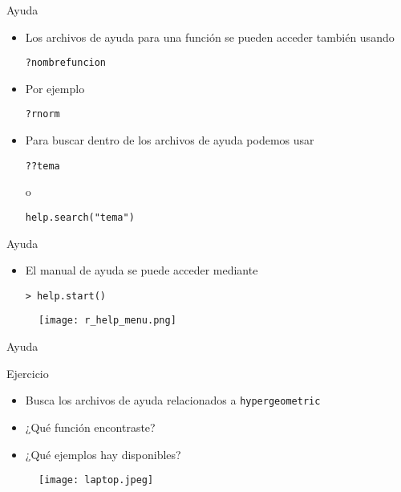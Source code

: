 \documentclass{beamer}
\begin{document}
\begin{frame}[fragile]{Ayuda}
\begin{itemize}
\item Los archivos de ayuda para una función se pueden acceder también usando
\begin{verbatim}
?nombrefuncion
\end{verbatim}
\item Por ejemplo
\begin{verbatim}
?rnorm
\end{verbatim}
\item Para buscar dentro de los archivos de ayuda podemos usar
\begin{verbatim}
??tema
\end{verbatim}
o
\begin{verbatim}
help.search("tema")
\end{verbatim}
\end{itemize}
\end{frame}


\begin{frame}[fragile]{Ayuda}
\begin{itemize}
\item El manual de ayuda se puede acceder mediante
\begin{verbatim}
> help.start()
\end{verbatim}
\end{itemize}
\begin{figure}[H]
\centering
\texttt{[image: r\_help\_menu.png]}
\end{figure}
\end{frame}

\begin{frame}[fragile]{Ayuda}
\begin{block}{Ejercicio}
\begin{itemize}
\item Busca los archivos de ayuda relacionados a \texttt{hypergeometric}
\item ¿Qué función encontraste?
\item ¿Qué ejemplos hay disponibles?
\end{itemize}
\end{block}
\begin{figure}[H]
\centering
\texttt{[image: laptop.jpeg]}
\end{figure}
\end{frame}
\end{document}
